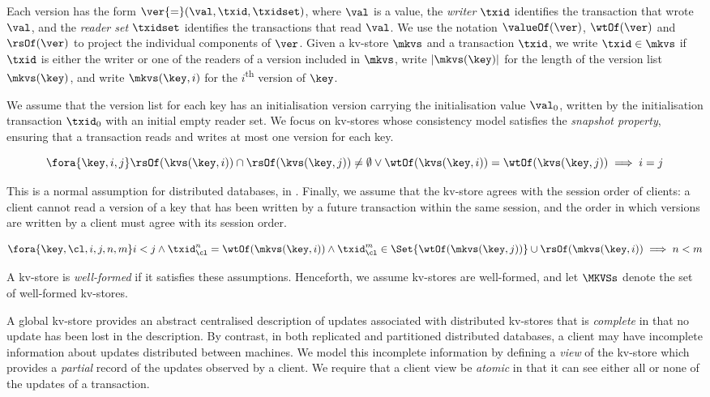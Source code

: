 Each version has the form 
$\ver {=} (\val, \txid, \txidset)$, where $\val$ is
a value, the \emph{writer} $\txid$ identifies the transaction that
wrote $\val$,  and the \emph{reader set} $\txidset$ identifies the
transactions that read $\val$. We use the notation 
$\valueOf(\ver)$,
$\wtOf(\ver)$ and $\rsOf(\ver)$ to project
the individual components of $\ver$.
Given a kv-store $\mkvs$ and a transaction $\txid$, we write 
$\txid \in \mkvs$ if $\txid$ is either the writer or 
one of the readers of a version included in $\mkvs$, 
write $\lvert \mkvs(\key) \rvert$ for the length of the version
list $\mkvs(\key)$,
and write $\mkvs(\key, i)$ for the $i$\textsuperscript{th} version of $\key$.

We assume that the version list for each key has an initialisation version 
carrying the initialisation value $\val_0$,  written by the 
initialisation transaction $\txid_0$ with an initial empty reader set.
We focus on kv-stores whose consistency model satisfies the
\emph{snapshot property}, ensuring that
a transaction reads and writes at most one version for each key.

\spaceshrink{-15pt}
{\displaymathfont
\[
\fora{\key, i, j} 
\rsOf(\kvs(\key, i)) \cap \rsOf(\kvs(\key, j)) \neq \emptyset \lor
\wtOf(\kvs(\key, i)) = \wtOf(\kvs(\key, j))
\implies i = j  
\]
\normalsize}
\spaceshrink{-15pt}

\noindent 
This is a normal assumption for distributed databases, \eg in \cite{ramp,rola,cops,wren,redblue,PSI,NMSI,gdur,clocksi,distrsi}.
Finally, we assume that the kv-store agrees with the session order of clients: 
a client cannot read a
version of a key that has been written by a future transaction within
the same session, and the order in which versions are written by a
client must agree with its session order. 

\spaceshrink{-15pt}
{\displaymathfont
\[
\fora{ \key, \cl, i,j, n, m} 
i < j
\land \txid_{\cl}^{n} = \wtOf(\mkvs(\key,i)) \land \txid_{\cl}^{m} \in
\Set{\wtOf(\mkvs(\key,j))} \cup \rsOf(\mkvs(\key, i)) \implies n < m
\]
\normalsize}
\spaceshrink{-15pt}

\noindent 
A kv-store is
\emph{well-formed} if it satisfies these assumptions.
Henceforth, we assume kv-stores are well-formed,
and let $\MKVSs$ denote the set of well-formed kv-stores.

A global kv-store provides an abstract centralised description of
updates associated with distributed kv-stores that is \emph{complete} in 
that no update has been lost in the description. By contrast, in
both replicated and partitioned distributed databases, a client may
have incomplete information about updates distributed between
machines.  We model this incomplete information by
defining a {\em view} of the kv-store which provides a {\em
  partial} record of the updates observed by a client. We require that a client view be {\em atomic} in that it can
see either all or none of the updates of a transaction.

